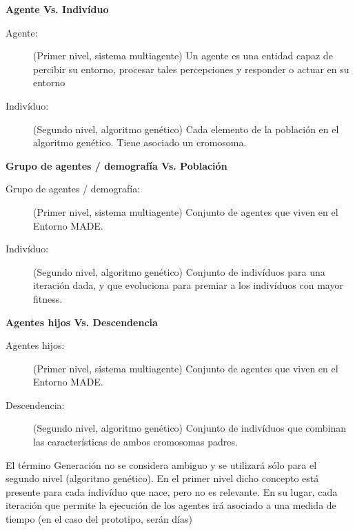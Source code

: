 \textbf{Agente Vs. Indivíduo}\\

\begin{description}
\item[Agente:] (Primer nivel, sistema multiagente) Un agente es una entidad capaz de percibir su entorno, procesar tales percepciones y responder o actuar en su entorno

\item[Indivíduo:] (Segundo nivel, algoritmo genético) Cada elemento de la población en el algoritmo genético. Tiene asociado un cromosoma. 
\end{description}

\textbf{Grupo de agentes / demografía Vs. Población}\\

\begin{description}
\item[Grupo de agentes / demografía:] (Primer nivel, sistema multiagente) Conjunto de agentes que viven en el Entorno MADE.

\item[Indivíduo:] (Segundo nivel, algoritmo genético) Conjunto de indivíduos para una iteración dada, y que evoluciona para premiar a los indivíduos con mayor fitness.
\end{description}

\textbf{Agentes hijos Vs. Descendencia}\\

\begin{description}
\item[Agentes hijos:] (Primer nivel, sistema multiagente) Conjunto de agentes que viven en el Entorno MADE.

\item[Descendencia:] (Segundo nivel, algoritmo genético) Conjunto de indivíduos que combinan las características de ambos cromosomas padres.
\end{description}

El término Generación no se considera ambiguo y se utilizará sólo para el segundo nivel (algoritmo genético). En el primer nivel dicho concepto está presente para cada indivíduo que nace, pero no es relevante. En su lugar, cada iteración que permite la ejecución de los agentes irá asociado a una medida de tiempo (en el caso del prototipo, serán días)